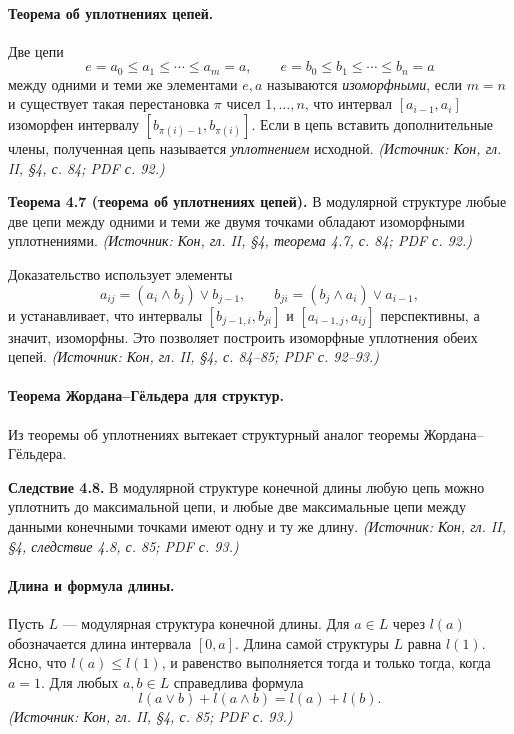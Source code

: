 \documentclass[a4paper,12pt]{article}
\begin{document}
\paragraph{Теорема об уплотнениях цепей.}
Две цепи
\[
e=a_0\le a_1\le\cdots\le a_m=a,
\qquad
e=b_0\le b_1\le\cdots\le b_n=a
\]
между одними и теми же элементами \(e,a\) называются \emph{изоморфными}, если \(m=n\) и существует такая перестановка \(\pi\) чисел \(1,\ldots,n\), что интервал \([a_{i-1},a_i]\) изоморфен интервалу \([b_{\pi(i)-1},b_{\pi(i)}]\). Если в цепь вставить дополнительные члены, полученная цепь называется \emph{уплотнением} исходной.
\textit{(Источник: Кон, гл. II, §4, с. 84; PDF с. 92.)}

\textbf{Теорема 4.7 (теорема об уплотнениях цепей).} В модулярной структуре любые две цепи между одними и теми же двумя точками обладают изоморфными уплотнениями.
\textit{(Источник: Кон, гл. II, §4, теорема 4.7, с. 84; PDF с. 92.)}

Доказательство использует элементы
\[
a_{ij}=(a_i\wedge b_j)\vee b_{j-1},
\qquad
b_{ji}=(b_j\wedge a_i)\vee a_{i-1},
\]
и устанавливает, что интервалы \([b_{j-1,i},b_{ji}]\) и \([a_{i-1,j},a_{ij}]\) перспективны, а значит, изоморфны. Это позволяет построить изоморфные уплотнения обеих цепей.
\textit{(Источник: Кон, гл. II, §4, с. 84--85; PDF с. 92--93.)}

\paragraph{Теорема Жордана--Гёльдера для структур.}
Из теоремы об уплотнениях вытекает структурный аналог теоремы Жордана--Гёльдера.

\textbf{Следствие 4.8.} В модулярной структуре конечной длины любую цепь можно уплотнить до максимальной цепи, и любые две максимальные цепи между данными конечными точками имеют одну и ту же длину.
\textit{(Источник: Кон, гл. II, §4, следствие 4.8, с. 85; PDF с. 93.)}

\paragraph{Длина и формула длины.}
Пусть \(L\) — модулярная структура конечной длины. Для \(a\in L\) через \(l(a)\) обозначается длина интервала \([0,a]\). Длина самой структуры \(L\) равна \(l(1)\). Ясно, что \(l(a)\le l(1)\), и равенство выполняется тогда и только тогда, когда \(a=1\). Для любых \(a,b\in L\) справедлива формула
\[
l(a\vee b)+l(a\wedge b)=l(a)+l(b).
\]
\textit{(Источник: Кон, гл. II, §4, с. 85; PDF с. 93.)}
\end{document}
